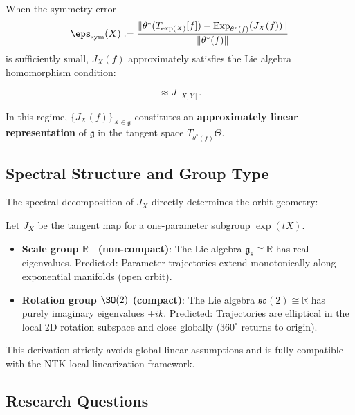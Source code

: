 When the symmetry error
\begin{equation}
    \eps_{\mathrm{sym}}(X) := \frac{\|\theta^*(T_{\exp(X)}[f]) - \mathrm{Exp}_{\theta^*(f)}(J_X(f))\|}{\|\theta^*(f)\|}
    \label{eq:symmetry_error}
\end{equation}
is sufficiently small, $J_X(f)$ approximately satisfies the Lie algebra homomorphism condition:

\begin{equation}
    [J_X, J_Y] \approx J_{[X,Y]}.
    \label{eq:lie_homomorphism}
\end{equation}

In this regime, $\{J_X(f)\}_{X \in \mathfrak{g}}$ constitutes an \textbf{approximately linear representation} of $\mathfrak{g}$ in the tangent space $T_{\theta^*(f)}\Theta$.

\subsection{Spectral Structure and Group Type}

The spectral decomposition of $J_X$ directly determines the orbit geometry:

\begin{prop}
Let $J_X$ be the tangent map for a one-parameter subgroup $\exp(tX)$.

\begin{itemize}
    \item \textbf{Scale group $\mathbb{R}^+$ (non-compact)}: The Lie algebra $\mathfrak{g}_s \cong \mathbb{R}$ has real eigenvalues.
    Predicted: Parameter trajectories extend monotonically along exponential manifolds (open orbit).

    \item \textbf{Rotation group $\SO(2)$ (compact)}: The Lie algebra $\mathfrak{so}(2) \cong \mathbb{R}$ has purely imaginary eigenvalues $\pm ik$.
    Predicted: Trajectories are elliptical in the local 2D rotation subspace and close globally ($360^\circ$ returns to origin).
\end{itemize}
\end{prop}

This derivation strictly avoids global linear assumptions and is fully compatible with the NTK local linearization framework.



\subsection{Research Questions}

